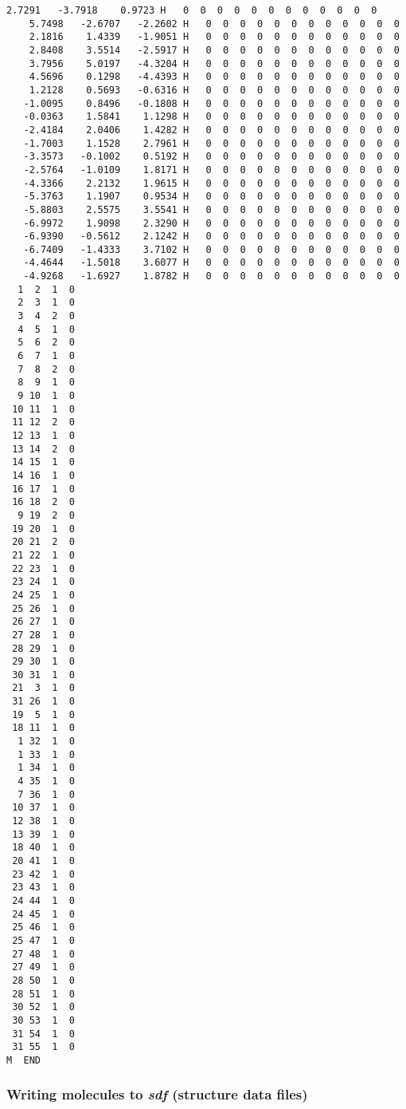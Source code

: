 \documentclass[11pt]{article}
\begin{document}
\begin{Verbatim}[commandchars=\\\{\}]
    2.7291   -3.7918    0.9723 H   0  0  0  0  0  0  0  0  0  0  0  0
    5.7498   -2.6707   -2.2602 H   0  0  0  0  0  0  0  0  0  0  0  0
    2.1816    1.4339   -1.9051 H   0  0  0  0  0  0  0  0  0  0  0  0
    2.8408    3.5514   -2.5917 H   0  0  0  0  0  0  0  0  0  0  0  0
    3.7956    5.0197   -4.3204 H   0  0  0  0  0  0  0  0  0  0  0  0
    4.5696    0.1298   -4.4393 H   0  0  0  0  0  0  0  0  0  0  0  0
    1.2128    0.5693   -0.6316 H   0  0  0  0  0  0  0  0  0  0  0  0
   -1.0095    0.8496   -0.1808 H   0  0  0  0  0  0  0  0  0  0  0  0
   -0.0363    1.5841    1.1298 H   0  0  0  0  0  0  0  0  0  0  0  0
   -2.4184    2.0406    1.4282 H   0  0  0  0  0  0  0  0  0  0  0  0
   -1.7003    1.1528    2.7961 H   0  0  0  0  0  0  0  0  0  0  0  0
   -3.3573   -0.1002    0.5192 H   0  0  0  0  0  0  0  0  0  0  0  0
   -2.5764   -1.0109    1.8171 H   0  0  0  0  0  0  0  0  0  0  0  0
   -4.3366    2.2132    1.9615 H   0  0  0  0  0  0  0  0  0  0  0  0
   -5.3763    1.1907    0.9534 H   0  0  0  0  0  0  0  0  0  0  0  0
   -5.8803    2.5575    3.5541 H   0  0  0  0  0  0  0  0  0  0  0  0
   -6.9972    1.9098    2.3290 H   0  0  0  0  0  0  0  0  0  0  0  0
   -6.9390   -0.5612    2.1242 H   0  0  0  0  0  0  0  0  0  0  0  0
   -6.7409   -1.4333    3.7102 H   0  0  0  0  0  0  0  0  0  0  0  0
   -4.4644   -1.5018    3.6077 H   0  0  0  0  0  0  0  0  0  0  0  0
   -4.9268   -1.6927    1.8782 H   0  0  0  0  0  0  0  0  0  0  0  0
  1  2  1  0
  2  3  1  0
  3  4  2  0
  4  5  1  0
  5  6  2  0
  6  7  1  0
  7  8  2  0
  8  9  1  0
  9 10  1  0
 10 11  1  0
 11 12  2  0
 12 13  1  0
 13 14  2  0
 14 15  1  0
 14 16  1  0
 16 17  1  0
 16 18  2  0
  9 19  2  0
 19 20  1  0
 20 21  2  0
 21 22  1  0
 22 23  1  0
 23 24  1  0
 24 25  1  0
 25 26  1  0
 26 27  1  0
 27 28  1  0
 28 29  1  0
 29 30  1  0
 30 31  1  0
 21  3  1  0
 31 26  1  0
 19  5  1  0
 18 11  1  0
  1 32  1  0
  1 33  1  0
  1 34  1  0
  4 35  1  0
  7 36  1  0
 10 37  1  0
 12 38  1  0
 13 39  1  0
 18 40  1  0
 20 41  1  0
 23 42  1  0
 23 43  1  0
 24 44  1  0
 24 45  1  0
 25 46  1  0
 25 47  1  0
 27 48  1  0
 27 49  1  0
 28 50  1  0
 28 51  1  0
 30 52  1  0
 30 53  1  0
 31 54  1  0
 31 55  1  0
M  END

\end{Verbatim}

    \hypertarget{writing-molecules-to-sdf-structure-data-files}{%
\subsubsection{\texorpdfstring{Writing molecules to \emph{sdf}
(structure data
files)}{Writing molecules to sdf (structure data files)}}\label{writing-molecules-to-sdf-structure-data-files}}
\end{document}
